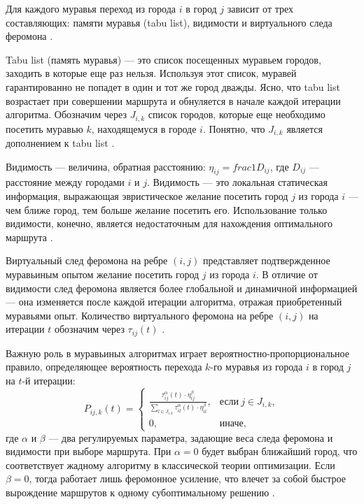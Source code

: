 Для каждого муравья переход из города $i$ в город $j$ зависит от трех составляющих: памяти муравья (tabu list), видимости и виртуального следа феромона \cite{Shtovba2003}.

Tabu list (память муравья) --- это список посещенных муравьем городов, заходить в которые еще раз нельзя.  
Используя этот список, муравей гарантированно не попадет в один и тот же город дважды. 
Ясно, что tabu list возрастает при совершении маршрута и обнуляется в начале каждой итерации алгоритма.  
Обозначим через $J_{i,k}$ список городов, которые еще необходимо посетить муравью $k$, находящемуся в городе $i$. 
Понятно, что $J_{i,k}$ является дополнением к tabu list \cite{Shtovba2003}.

Видимость --- величина, обратная расстоянию: $\eta_{ij} = frac{1}{D_{ij}}$, где $D_{ij}$ --- расстояние между городами $i$ и $j$. 
Видимость --- это локальная статическая информация, выражающая эвристическое желание посетить город $j$ из города $i$ --- чем ближе город, тем больше желание посетить его. 
Использование только видимости, конечно, является недостаточным для нахождения оптимального маршрута \cite{Shtovba2003}.

Виртуальный след феромона на ребре $(i, j)$ представляет подтвержденное муравьиным опытом желание посетить город $j$ из города $i$. 
В отличие от видимости след феромона является более глобальной и динамичной информацией --- она изменяется после каждой итерации алгоритма, отражая приобретенный муравьями опыт. 
Количество виртуального феромона на ребре $(i, j)$ на итерации $t$ обозначим через $\tau_{ij}(t)$ \cite{Shtovba2003}.

Важную роль в муравьиных алгоритмах играет вероятностно-пропорциональное правило, определяющее вероятность перехода $k$-го муравья из города $i$ в город $j$ на $t$-й итерации:
\begin{equation}
P_{ij,k}(t) = 
\begin{cases}
\frac{\tau^\alpha_{ij}(t) \cdot \eta^\beta_{ij}}{\displaystyle\sum_{l \in J_{i,k}}^{} \tau^\alpha_{il}(t) \cdot \eta^\beta_{il}}, & \text{если}~j \in J_{i,k}, \\
0, & \text{иначе},
\end{cases}
\end{equation}
где $\alpha$ и $\beta$ --- два регулируемых параметра, задающие веса следа феромона и видимости при выборе маршрута. 
При $\alpha = 0$ будет выбран ближайший город, что соответствует жадному алгоритму в классической теории оптимизации. 
Если $\beta = 0$, тогда работает лишь феромонное усиление, что влечет за собой быстрое вырождение маршрутов к одному субоптимальному решению \cite{Shtovba2003}.

